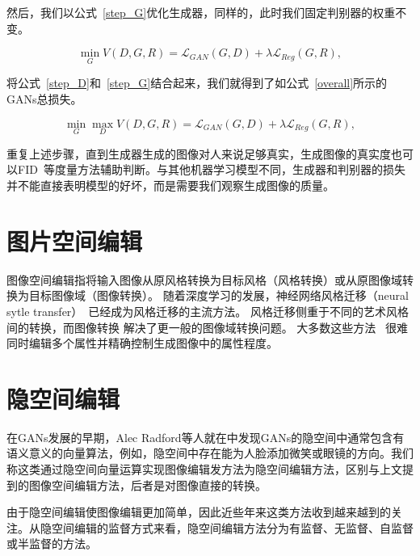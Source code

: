 然后，我们以公式~\ref{step_G}优化生成器，同样的，此时我们固定判别器的权重不变。

\begin{equation}
    \min _{G} V(D, G, R) = \mathcal{L}_{GAN}(G, D) + \lambda \mathcal{L}_{Reg}(G, R),
    \label{step_G}
\end{equation}

将公式~\ref{step_D}和~\ref{step_G}结合起来，我们就得到了如公式~\ref{overall}所示的GANs总损失。

\begin{equation}
    \min _{G} \max _{D} V(D, G, R) = \mathcal{L}_{GAN}(G, D) + \lambda \mathcal{L}_{Reg}(G, R),
\end{equation}

重复上述步骤，直到生成器生成的图像对人来说足够真实，生成图像的真实度也可以FID~\cite{FID}等度量方法辅助判断。与其他机器学习模型不同，生成器和判别器的损失并不能直接表明模型的好坏，而是需要我们观察生成图像的质量。

\section{图片空间编辑}

图像空间编辑指将输入图像从原风格转换为目标风格（风格转换）或从原图像域转换为目标图像域（图像转换）。 随着深度学习的发展，神经网络风格迁移（neural sytle transfer）~\cite{transfer0,transfer1,transfer2}已经成为风格迁移的主流方法。 风格迁移侧重于不同的艺术风格间的转换，而图像转换\cite{i2i0,i2i1,i2i2,cyclegan} 解决了更一般的图像域转换问题。
大多数这些方法~\cite{yu2018super,lu2018attribute} 很难同时编辑多个属性并精确控制生成图像中的属性程度。

\section{隐空间编辑}

在GANs发展的早期，Alec Radford等人就在\cite{DCGAN}中发现GANs的隐空间中通常包含有语义意义的向量算法，例如，隐空间中存在能为人脸添加微笑或眼镜的方向。我们称这类通过隐空间向量运算实现图像编辑发方法为隐空间编辑方法，区别与上文提到的图像空间编辑方法，后者是对图像直接的转换。

由于隐空间编辑使图像编辑更加简单，因此近些年来这类方法收到越来越到的关注。从隐空间编辑的监督方式来看，隐空间编辑方法分为有监督、无监督、自监督或半监督的方法。

